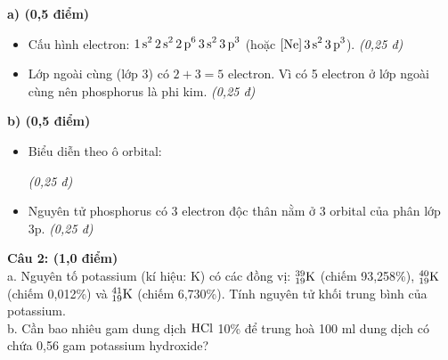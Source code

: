 \documentclass[11pt,a4paper]{article}
\begin{document}
\begin{tcolorbox}[colback=white,colframe=solBlue,title=\textbf{Lời giải chi tiết và Biểu điểm Câu 1:}]
\textbf{a) (0,5 điểm)}
\begin{itemize}[leftmargin=1.2cm]
\item Cấu hình electron: $\ce{1s^2 2s^2 2p^6 3s^2 3p^3}$ (hoặc $\ce{[Ne] 3s^2 3p^3}$). \hfill \textit{(0,25 đ)}
\item Lớp ngoài cùng (lớp 3) có $2 + 3 = 5$ electron. Vì có 5 electron ở lớp ngoài cùng nên phosphorus là phi kim. \hfill \textit{(0,25 đ)}
\end{itemize}
\textbf{b) (0,5 điểm)}
\begin{itemize}[leftmargin=1.2cm]
\item Biểu diễn theo ô orbital:
\begin{center}
\end{center}
\hfill \textit{(0,25 đ)}
\item Nguyên tử phosphorus có 3 electron độc thân nằm ở 3 orbital của phân lớp 3p. \hfill \textit{(0,25 đ)}
\end{itemize}
\end{tcolorbox}

\vspace{4pt}
\noindent
\textbf{Câu 2: (1,0 điểm)}\\
a. Nguyên tố potassium (kí hiệu: K) có các đồng vị: $^{39}_{19}\ce{K}$ (chiếm 93,258\%), $^{40}_{19}\ce{K}$ (chiếm 0,012\%) và $^{41}_{19}\ce{K}$ (chiếm 6,730\%). Tính nguyên tử khối trung bình của potassium.\\
b. Cần bao nhiêu gam dung dịch $\ce{HCl}$ 10\% để trung hoà 100 ml dung dịch có chứa 0,56 gam potassium hydroxide?
\end{document}
